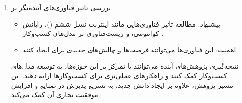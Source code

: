 \documentclass[10pt, twocolumn]{article}
\begin{document}
\begin{enumerate}
\item 
بررسی تاثیر فناوری‌های آینده‌نگر بر   
\begin{itemize}
\item پیشنهاد: مطالعه تاثیر فناوری‌هایی مانند اینترنت نسل ششم ()، رایانش کوانتومی، و زیست‌فناوری بر مدل‌های کسب‌وکار .  
\item اهمیت: این فناوری‌ها می‌توانند فرصت‌ها و چالش‌های جدیدی برای  ایجاد کنند.  
\end{itemize}

 نتیجه‌گیری  
پژوهش‌های آینده می‌توانند با تمرکز بر این حوزه‌ها، به توسعه مدل‌های کسب‌وکار  کمک کنند و راهکارهای عملی‌تری برای کسب‌وکارها ارائه دهند. این مسیر پژوهش، علاوه بر ایجاد دانش جدید، به تسریع پذیرش  در صنایع و افزایش موفقیت تجاری آن کمک می‌کند.
\end{enumerate}
\end{document}
